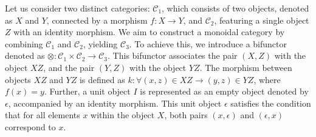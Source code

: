 



Let us consider two distinct categories: $\mathcal{C}_1$, which consists of two objects, denoted as $X$ and $Y$, connected by a morphism $f: X \to Y$, and $\mathcal{C}_2$, featuring a single object $Z$ with an identity morphism. We aim to construct a monoidal category by combining $\mathcal{C}_1$ and $\mathcal{C}_2$, yielding $\mathcal{C}_3$. To achieve this, we introduce a bifunctor denoted as $\otimes: \mathcal{C}_1 \times \mathcal{C}_2 \to \mathcal{C}_3$. This bifunctor associates the pair $(X,Z)$ with the object $XZ$, and the pair $(Y,Z)$ with the object $YZ$. The morphism between objects $XZ$ and $YZ$ is defined as $k: \forall (x,z)\in XZ \to (y,z) \in YZ$, where $f(x)=y$.  Further,  a unit object $I$ is represented as an empty object denoted by $\epsilon$, accompanied by an identity morphism. This unit object $\epsilon$ satisfies the condition that for all elements $x$ within the object $X$, both pairs $(x,\epsilon)$ and $(\epsilon,x)$ correspond to $x$.








